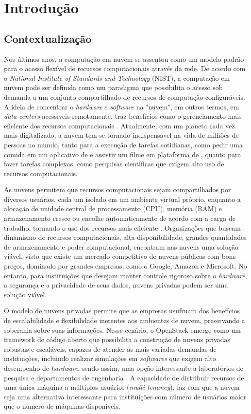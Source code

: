 \chapter{Introdução}

\section{Contextualização}

Nos últimos anos, a computação em nuvem se assentou como um modelo padrão para o acesso flexível de recursos computacionais através da rede. De acordo com o \textit{National Institute of Standards and Technology} (NIST), a computação em nuvem pode ser definida como um paradigma que possibilita o acesso sob demanda a um conjunto compartilhado de recursos de computação configuráveis. A ideia de concentrar o \textit{hardware} e \textit{software} na "nuvem", em outros termos, em \textit{data centers} acessíveis remotamente, traz benefícios como o gerenciamento mais eficiente dos recursos computacionais \cite{mell2011}. Atualmente, com um planeta cada vez mais digitalizado, a nuvem tem se tornado indispensável na vida de milhões de pessoas no mundo, tanto para a execução de tarefas cotidianas, como pedir uma comida em um aplicativo de \cite{delivery} e assistir um filme em plataforma de \cite{streaming}, quanto para fazer tarefas complexas, como pesquisas científicas que exigem alto uso de recursos computacionais.

As nuvens permitem que recursos computacionais sejam compartilhados por diversos usuários, cada um isolado em um ambiente virtual próprio, enquanto a alocação de unidade central de processamento (CPU), memória (RAM) e armazenamento cresce ou encolhe automaticamente de acordo com a carga de trabalho, tornando o uso dos recursos mais eficiente \cite{dai2015, ray2013}. Organizações que buscam dinamismo de recursos computacionais, alta disponibilidade, grandes quantidades de armazenamento e poder computacional, encontram nas nuvens uma solução viável, visto que existe um mercado competitivo de nuvens públicas com bons preços, dominado por grandes empresas, como o Google, Amazon e Microsoft. No entanto, para instituições que desejam manter controle rigoroso sobre o \textit{hardware}, a segurança e a privacidade de seus dados, nuvens privadas podem ser uma solução viável.

O modelo de nuvens privadas permite que as empresas usufruam dos benefícios de escalabilidade e flexibilidade inerentes aos ambientes de nuvem, preservando a soberania sobre suas informações. Nesse cenário, o OpenStack emerge como um framework de código aberto que possibilita a construção de nuvens privadas robustas e escaláveis, capazes de atender as mais variadas demandas de instituições, incluindo realizar simulações em \textit{softwares} que exigem alto desempenho de \textit{hardware}, sendo assim, uma opção interessante a laboratórios de pesquisa e departamentos de engenharia \cite{heuchert2021}. A capacidade de distribuir recursos de uma única máquina a múltiplos usuários (\textit{multi-tenancy}), faz com que a nuvem seja uma alternativa interessante para instituições com número de usuários maior que o número de máquinas disponíveis.

